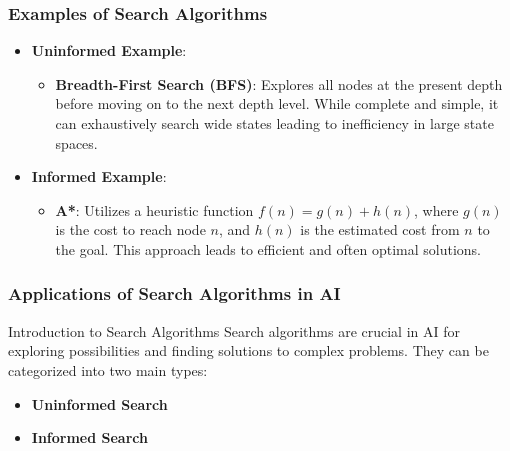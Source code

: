 \documentclass[aspectratio=169]{beamer}
\begin{document}
\begin{frame}[fragile]
    \frametitle{Examples of Search Algorithms}
    \begin{itemize}
        \item \textbf{Uninformed Example}:
        \begin{itemize}
            \item \textbf{Breadth-First Search (BFS)}: Explores all nodes at the present depth before moving on to the next depth level. While complete and simple, it can exhaustively search wide states leading to inefficiency in large state spaces.
        \end{itemize}
        
        \item \textbf{Informed Example}:
        \begin{itemize}
            \item \textbf{A*}: Utilizes a heuristic function \( f(n) = g(n) + h(n) \), where \( g(n) \) is the cost to reach node \( n \), and \( h(n) \) is the estimated cost from \( n \) to the goal. This approach leads to efficient and often optimal solutions.
        \end{itemize}
    \end{itemize}
\end{frame}

\begin{frame}[fragile]
    \frametitle{Applications of Search Algorithms in AI}
    \begin{block}{Introduction to Search Algorithms}
        Search algorithms are crucial in AI for exploring possibilities and finding solutions to complex problems. They can be categorized into two main types:
        \begin{itemize}
            \item \textbf{Uninformed Search}
            \item \textbf{Informed Search}
        \end{itemize}
    \end{block}
\end{frame}
\end{document}
